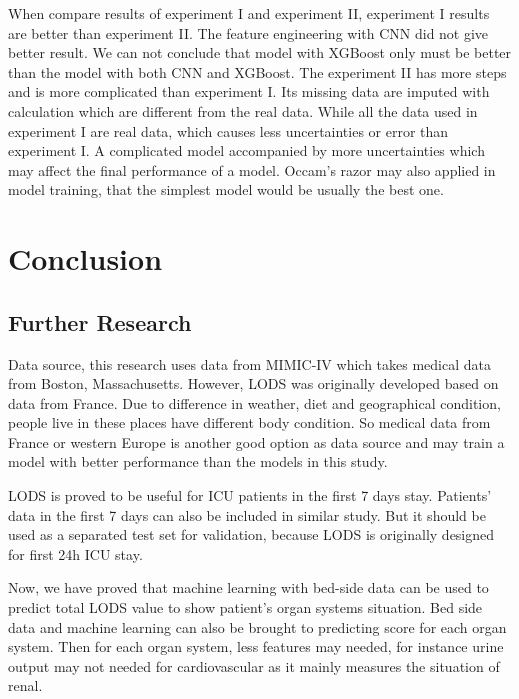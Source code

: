 \documentclass[12pt,a4paper,english
]{tunithesis}
\begin{document}
When compare results of experiment I and experiment II, experiment I results are better than experiment II. The feature engineering with CNN did not give better result. We can not conclude that model with XGBoost only must be better than the model with both CNN and XGBoost. The experiment II has more steps and is more complicated than experiment I. Its missing data are imputed with calculation which are different from the real data. While all the data used in experiment I are real data, which causes less uncertainties or error than experiment I. A complicated model accompanied by more uncertainties which may affect the final performance of a model. Occam's razor may also applied in model training, that the simplest model would be usually the best one.


\chapter{Conclusion}
\label{ch:conclusion}

\section{Further Research}
Data source, this research uses data from MIMIC-IV which takes medical data from Boston, Massachusetts. However, LODS was originally developed based on data from France. Due to difference in weather, diet and geographical condition, people live in these places have different body condition. So medical data from France or western Europe is another good option as data source and may train a model with better performance than the models in this study.

LODS is proved to be useful for ICU patients in the first 7 days stay. Patients' data in the first 7 days can also be included in similar study. But it should be used as a separated test set for validation, because LODS is originally designed for first 24h ICU stay.

Now, we have proved that machine learning with bed-side data can be used to predict total LODS value to show patient's organ systems situation. Bed side data and machine learning can also be brought to predicting score for each organ system. Then for each organ system, less features may needed, for instance urine output may not needed for cardiovascular as it mainly measures the situation of renal.




\newpage

\printbibliography[title=References]
\end{document}
